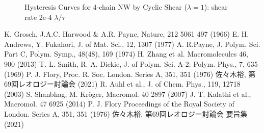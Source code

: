 \documentclass[uplatex,dvipdfmx,a4paper,10pt]{jsarticle}
\begin{document}
\begin{figure}[hb]
\begin{minipage}{0.5\hsize}
\begin{center}
        \caption{Hysteresis Curves for 4-chain NW by Cyclic Shear ($\lambda = 1$): shear rate 2e-4 $\lambda/\tau$}
        \label{fig:hyst}
        \end{center}
    \end{minipage}
\end{figure}

\vspace{-7mm}
\begin{thebibliography}{99}
     K. Grosch, J.A.C. Harwood \& A.R. Payne, Nature, 212 5061 497 (1966)
     E. H. Andrews, Y. Fukahori, J. of Mat. Sci., 12, 1307 (1977)
     A. R.Payne, J. Polym. Sci. Part C, Polym. Symp., 48(48), 169 (1974)
     H. Zhang et al. Macromolecules 46, 900 (2013)
     T. L. Smith, R. A. Dickie, J. of Polym. Sci. A-2: Polym. Phys., 7, 635 (1969)
     P. J. Flory, Proc. R. Soc. London. Series A, 351, 351 (1976)
     佐々木裕, 第69回レオロジー討論会 (2021)
     R. Auhl et al., J. of Chem. Phys., 119, 12718 (2003)
     S. Shanbhag, M. Kr\"{o}ger, Macromol. 40 2897 (2007)
     J. T. Kalathi et al., Macromol. 47 6925 (2014)
     P. J. Flory Proceedings of the Royal Society of London. Series A, 351, 351 (1976)
     佐々木裕, 第69回レオロジー討論会 要旨集 (2021)
\end{thebibliography}
\end{document}
